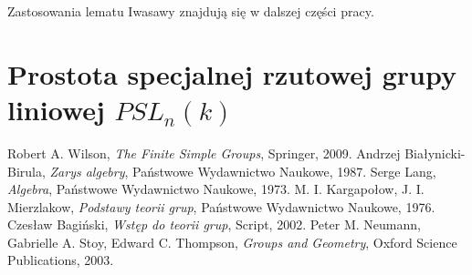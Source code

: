 \documentclass[licencjacka]{pracamgr}
\begin{document}
Zastosowania lematu Iwasawy znajdują się w dalszej części pracy.



\chapter{Prostota specjalnej rzutowej grupy liniowej $PSL_n(k)$}


\begin{thebibliography}{99}

 Robert A. Wilson, \textit{The Finite Simple Groups}, Springer, 2009.
 Andrzej Białynicki-Birula, \textit{Zarys algebry}, Państwowe Wydawnictwo Naukowe, 1987.
 Serge Lang, \textit{Algebra}, Państwowe Wydawnictwo Naukowe, 1973.
 M. I. Kargapołow, J. I. Mierzlakow, \textit{Podstawy teorii grup}, Państwowe Wydawnictwo Naukowe, 1976.
 Czesław Bagiński, \textit{Wstęp do teorii grup}, Script, 2002.
 Peter M. Neumann, Gabrielle A. Stoy, Edward C. Thompson, \textit{Groups and Geometry}, Oxford Science Publications, 2003.



\end{thebibliography}
\end{document}
